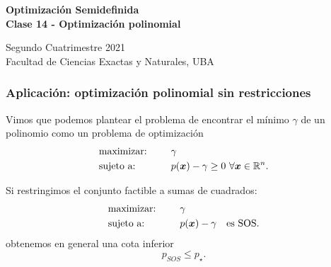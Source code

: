 \documentclass[aspectratio=169,12pt,spanish]{beamer}
\begin{document}

\begin{frame}

 \begin{center}

\Large\textbf{Optimización Semidefinida} \\
\large\textbf{Clase 14 - Optimización polinomial}




\vspace{1cm}
 Segundo Cuatrimestre 2021
 \\
 {\small Facultad de Ciencias Exactas y Naturales, UBA}
 \end{center}

\end{frame}




\begin{frame}

\frametitle{Aplicación: optimización polinomial sin restricciones}

Vimos que podemos plantear el problema de encontrar el mínimo $\gamma$ de un polinomio como un problema de optimización
\begin{alignat*}{2}
  & \text{maximizar: } & & \gamma  \\
  & \text{sujeto a: } & \quad & p(\xb) - \gamma \ge 0 \ \forall \xb \in \R^n.
\end{alignat*}

Si restringimos el conjunto factible a sumas de cuadrados:
\begin{alignat*}{2}
  & \text{maximizar: } & & \gamma  \\
  & \text{sujeto a: } & \quad & p(\bm{x}) - \gamma \quad \text{es SOS}.
\end{alignat*}
obtenemos en general una cota inferior
$$
p_{SOS} \le p_{\star}.
$$
\end{frame}

\end{document}
